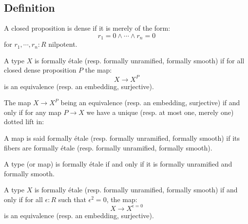 \subsection{Definition}

\begin{definition}
A closed proposition is dense if it is merely of the form:
\[r_1=0\land\cdots\land r_n=0\]
for $r_1,\cdots,r_n:R$ nilpotent.
\end{definition}

\begin{definition}
A type $X$ is formally étale (resp. formally unramified, formally smooth) if for all closed dense proposition $P$ the map:
\[X\to X^P\]
is an equivalence (resp. an embedding, surjective).
\end{definition}

\begin{remark}
The map $X\to X^P$ being an equivalence (resp. an embedding, surjective) if and only if for any map $P\to X$ we have a unique (resp. at most one, merely one) dotted lift in:
\begin{center}
\end{center}
\end{remark}

\begin{definition}
A map is said formally étale (resp. formally unramified, formally smooth) if its fibers are formally étale (resp. formally unramified, formally smooth).
\end{definition}

\begin{remark}
A type (or map) is formally étale if and only if it is formally unramified and formally smooth.
\end{remark}

\begin{lemma}
A type $X$ is formally étale (resp. formally unramified, formally smooth) if and only if for all $\epsilon:R$ such that $\epsilon^2=0$, the map:
\[X\to X^{\epsilon=0}\]
is an equivalence (resp. an embedding, surjective).
\end{lemma}

